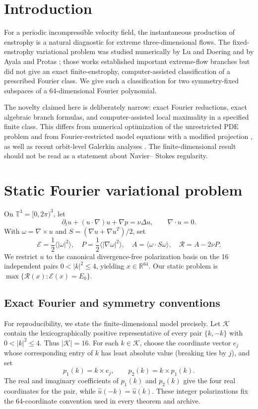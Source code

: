 \documentclass[11pt]{article}
\newcommand{\T}{\mathbb{T}}
\newcommand{\R}{\mathbb{R}}
\newcommand{\E}{\mathcal{E}}
\newcommand{\rate}{\mathcal{R}}
\begin{document}
\section{Introduction}
For a periodic incompressible velocity field, the instantaneous production of
enstrophy is a natural diagnostic for extreme three-dimensional flows.  The
fixed-enstrophy variational problem was studied numerically by Lu and Doering
\cite{LuDoering2008} and by Ayala and Protas \cite{AyalaProtas2017}; those
works established important extreme-flow branches but did not give an exact
finite-enstrophy, computer-assisted classification of a prescribed Fourier
class.  We give such a classification for two symmetry-fixed subspaces of a
64-dimensional Fourier polynomial.

The novelty claimed here is deliberately narrow: exact Fourier reductions,
exact algebraic branch formulas, and computer-assisted local maximality in a
specified finite class.  This differs from numerical optimization of the
unrestricted PDE problem \cite{LuDoering2008,AyalaProtas2017,KangYunProtas2020}
and from Fourier-restricted model equations with a modified projection
\cite{Miller2025}, as well as recent orbit-level Galerkin analyses
\cite{Kiriukhin2026,KiriukhinTransfer2026}. The
finite-dimensional result should not be read as a statement about Navier--
Stokes regularity.

\section{Static Fourier variational problem}
On $\T^3=[0,2\pi)^3$, let
\[
 \partial_t u+(u\cdot\nabla)u+\nabla p=\nu\Delta u,\qquad \nabla\cdot u=0.
\]
With $\omega=\nabla\times u$ and $S=(\nabla u+\nabla u^T)/2$, set
\[
 \E=\frac12\langle|\omega|^2\rangle,\quad
 P=\frac12\langle|\nabla\omega|^2\rangle,\quad
 A=\langle\omega\cdot S\omega\rangle,\quad
 \rate=A-2\nu P.
\]
We restrict $u$ to the canonical divergence-free polarization basis on the 16
independent pairs $0<|k|^2\leq4$, yielding $x\in\R^{64}$.  Our static problem
is $\max\{\rate(x):\E(x)=E_0\}$.

\subsection{Exact Fourier and symmetry conventions}
For reproducibility, we state the finite-dimensional model precisely. Let
$\mathcal K$ contain the lexicographically positive representative of every
pair $\{k,-k\}$ with $0<|k|^2\leq4$. Thus $|\mathcal K|=16$. For each
$k\in\mathcal K$, choose the coordinate vector $e_j$ whose corresponding
entry of $k$ has least absolute value (breaking ties by $j$), and set
\[
 p_1(k)=k\times e_j,\qquad p_2(k)=k\times p_1(k).
\]
The real and imaginary coefficients of $p_1(k)$ and $p_2(k)$ give the four
real coordinates for the pair, while $\widehat u(-k)=\overline{\widehat
u(k)}$. These integer polarizations fix the 64-coordinate convention used in
every theorem and archive.
\end{document}
